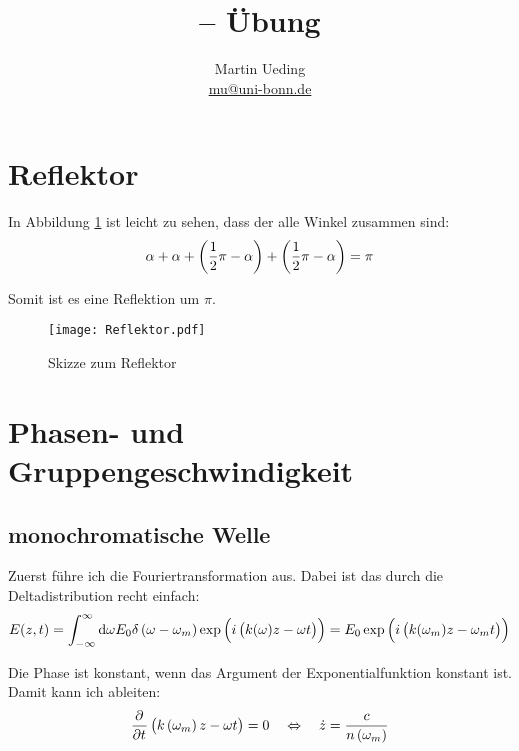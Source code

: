 \documentclass[11pt, ngerman, fleqn]{article}
\title{\themodul{} -- Übung \theuebung \\ \vspace{0.5cm} \large{\thegruppe}}
\author{Martin Ueding \\ \small{\href{mailto:mu@uni-bonn.de}{mu@uni-bonn.de}}}
\newcommand{\half}{\frac 12}
\begin{document}
\maketitle


\section{Reflektor}

In Abbildung \ref{fig:ref} ist leicht zu sehen, dass der alle Winkel zusammen
sind:
\[
	\alpha + \alpha + \del{\half \pi - \alpha} + \del{\half \pi - \alpha} = \pi
\]

Somit ist es eine Reflektion um $\pi$.

\begin{figure}[h]
	\centering
	\texttt{[image: Reflektor.pdf]}
	\caption{Skizze zum Reflektor}
	\label{fig:ref}
\end{figure}


\section{Phasen- und Gruppengeschwindigkeit}

\subsection{monochromatische Welle}

Zuerst führe ich die Fouriertransformation aus. Dabei ist das durch die Deltadistribution recht einfach:
\[
	E(z, t)
	= \int_{-\infty}^\infty \dif \omega E_0 \delta\del{\omega - \omega_m} \exp\del{i\del{k(\omega) z - \omega t}}
	= E_0 \exp\del{i\del{k(\omega_m) z - \omega_m t}}
\]

Die Phase ist konstant, wenn das Argument der Exponentialfunktion konstant ist. Damit kann ich ableiten:
\[
	\dpd{}t \del{k\del{\omega_m} z - \omega t} = 0
	\quad \Leftrightarrow \quad
	\dot z = \frac{c}{n\del{\omega_m}}
\]
\end{document}
